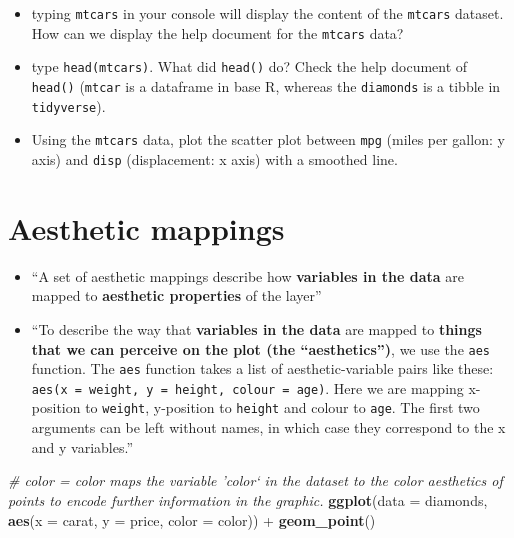 \documentclass[]{book}
\newenvironment{Shaded}{\begin{snugshade}}{\end{snugshade}}
\newcommand{\KeywordTok}[1]{\textcolor[rgb]{0.13,0.29,0.53}{\textbf{{#1}}}}
\newcommand{\DataTypeTok}[1]{\textcolor[rgb]{0.13,0.29,0.53}{{#1}}}
\newcommand{\StringTok}[1]{\textcolor[rgb]{0.31,0.60,0.02}{{#1}}}
\newcommand{\CommentTok}[1]{\textcolor[rgb]{0.56,0.35,0.01}{\textit{{#1}}}}
\newcommand{\NormalTok}[1]{{#1}}
\begin{document}
\begin{itemize}
\item
  typing \texttt{mtcars} in your console will display the content of the
  \texttt{mtcars} dataset. How can we display the help document for the
  \texttt{mtcars} data?
\item
  type \texttt{head(mtcars)}. What did \texttt{head()} do? Check the
  help document of \texttt{head()} (\texttt{mtcar} is a dataframe in
  base R, whereas the \texttt{diamonds} is a tibble in
  \texttt{tidyverse}).
\item
  Using the \texttt{mtcars} data, plot the scatter plot between
  \texttt{mpg} (miles per gallon: y axis) and \texttt{disp}
  (displacement: x axis) with a smoothed line.
\end{itemize}

\section{Aesthetic mappings}\label{aesthetic-mappings}

\begin{itemize}
\item
  ``A set of aesthetic mappings describe how \textbf{variables in the
  data} are mapped to \textbf{aesthetic properties} of the layer''
  \citep{ggplot2}
\item
  ``To describe the way that \textbf{variables in the data} are mapped
  to \textbf{things that we can perceive on the plot (the
  ``aesthetics'')}, we use the \texttt{aes} function. The \texttt{aes}
  function takes a list of aesthetic-variable pairs like these:
  \texttt{aes(x\ =\ weight,\ y\ =\ height,\ colour\ =\ age)}. Here we
  are mapping x-position to \texttt{weight}, y-position to
  \texttt{height} and colour to \texttt{age}. The first two arguments
  can be left without names, in which case they correspond to the x and
  y variables.'' \citep{ggplot2}
\end{itemize}

\begin{Shaded}
\begin{Highlighting}[]
\CommentTok{# color = color maps the variable 'color` in the dataset to the color aesthetics of points to encode further information in the graphic. }
\KeywordTok{ggplot}\NormalTok{(}\DataTypeTok{data =} \NormalTok{diamonds, }\KeywordTok{aes}\NormalTok{(}\DataTypeTok{x =} \NormalTok{carat, }\DataTypeTok{y =} \NormalTok{price, }\DataTypeTok{color =} \NormalTok{color)) +}\StringTok{ }\KeywordTok{geom_point}\NormalTok{()}
\end{Highlighting}
\end{Shaded}
\end{document}
